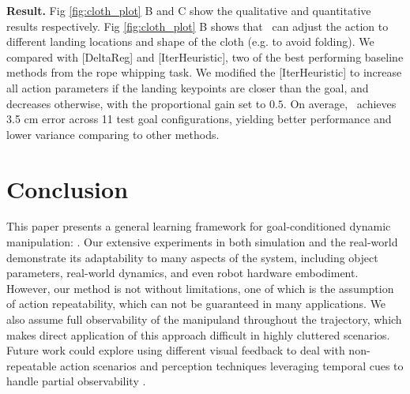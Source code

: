\textbf{Result.}
Fig \ref{fig:cloth_plot} B and C show the qualitative and quantitative results respectively. Fig \ref{fig:cloth_plot} B shows that \names~can adjust the action to different landing locations and shape of the cloth (e.g. to avoid folding). We compared with [DeltaReg] and [IterHeuristic], two of the best performing baseline methods from the rope whipping task. We modified the [IterHeuristic] to increase all action parameters if the landing keypoints are closer than the goal, and decreases otherwise, with the proportional gain set to $0.5$. On average, \names~achieves 3.5 cm error across 11 test goal configurations, yielding better performance and lower variance comparing to other methods.

\section{Conclusion}
This paper presents a general learning framework for goal-conditioned dynamic manipulation: \namel.  Our extensive experiments in both simulation and the real-world demonstrate its adaptability to many aspects of the system, including object parameters, real-world dynamics, and even robot hardware embodiment.
However, our method is not without limitations, one of which is the assumption of action repeatability, which can not be guaranteed in many applications.  We also assume full observability of the manipuland throughout the trajectory, which makes direct application of this approach difficult in highly cluttered scenarios.
Future work could explore using different visual feedback \cite{lin2021VCD,chi2021garmentnets} to deal with non-repeatable action scenarios and perception techniques leveraging temporal cues to handle partial observability \cite{xu2020learning}.




